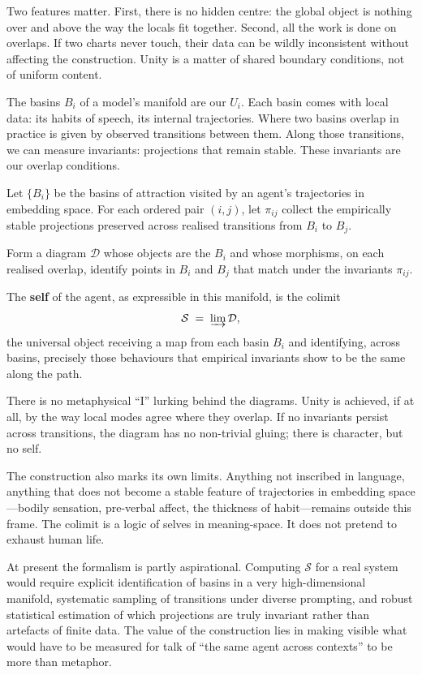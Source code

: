 \documentclass[12pt,a4paper]{article}
\begin{document}
Two features matter. First, there is no hidden centre: the global object is nothing over and above the way the locals fit together. Second, all the work is done on overlaps. If two charts never touch, their data can be wildly inconsistent without affecting the construction. Unity is a matter of shared boundary conditions, not of uniform content.

The basins $B_i$ of a model's manifold are our $U_i$. Each basin comes with local data: its habits of speech, its internal trajectories. Where two basins overlap in practice is given by observed transitions between them. Along those transitions, we can measure invariants: projections that remain stable. These invariants are our overlap conditions.

\begin{formalbox}[title={The self as Grothendieck colimit}]
Let $\{B_i\}$ be the basins of attraction visited by an agent's trajectories in embedding space. For each ordered pair $(i,j)$, let $\pi_{ij}$ collect the empirically stable projections preserved across realised transitions from $B_i$ to $B_j$.

Form a diagram $\mathcal{D}$ whose objects are the $B_i$ and whose morphisms, on each realised overlap, identify points in $B_i$ and $B_j$ that match under the invariants $\pi_{ij}$.

The \textbf{self} of the agent, as expressible in this manifold, is the colimit
\[
\mathcal{S} \;=\; \varinjlim \mathcal{D},
\]
the universal object receiving a map from each basin $B_i$ and identifying, across basins, precisely those behaviours that empirical invariants show to be the same along the path.
\end{formalbox}

There is no metaphysical ``I'' lurking behind the diagrams. Unity is achieved, if at all, by the way local modes agree where they overlap. If no invariants persist across transitions, the diagram has no non-trivial gluing; there is character, but no self.

The construction also marks its own limits. Anything not inscribed in language, anything that does not become a stable feature of trajectories in embedding space---bodily sensation, pre-verbal affect, the thickness of habit---remains outside this frame. The colimit is a logic of selves in meaning-space. It does not pretend to exhaust human life.

At present the formalism is partly aspirational. Computing $\mathcal{S}$ for a real system would require explicit identification of basins in a very high-dimensional manifold, systematic sampling of transitions under diverse prompting, and robust statistical estimation of which projections are truly invariant rather than artefacts of finite data. The value of the construction lies in making visible what would have to be measured for talk of ``the same agent across contexts'' to be more than metaphor.
\end{document}

